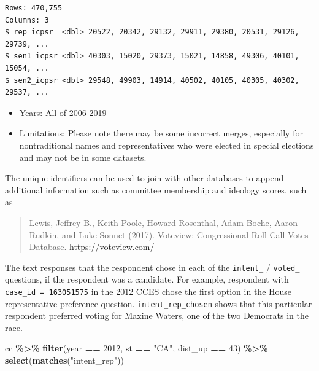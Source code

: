 \documentclass[10pt,article,oneside]{memoir}
\theoremstyle{definition}
\newenvironment{Shaded}{\begin{snugshade}}{\end{snugshade}}
\newcommand{\DecValTok}[1]{\textcolor[rgb]{0.00,0.00,0.81}{#1}}
\newcommand{\KeywordTok}[1]{\textcolor[rgb]{0.13,0.29,0.53}{\textbf{#1}}}
\newcommand{\NormalTok}[1]{#1}
\newcommand{\OperatorTok}[1]{\textcolor[rgb]{0.81,0.36,0.00}{\textbf{#1}}}
\newcommand{\StringTok}[1]{\textcolor[rgb]{0.31,0.60,0.02}{#1}}
\begin{document}
\begin{verbatim}
Rows: 470,755
Columns: 3
$ rep_icpsr  <dbl> 20522, 20342, 29132, 29911, 29380, 20531, 29126, 29739, ...
$ sen1_icpsr <dbl> 40303, 15020, 29373, 15021, 14858, 49306, 40101, 15054, ...
$ sen2_icpsr <dbl> 29548, 49903, 14914, 40502, 40105, 40305, 40302, 29537, ...
\end{verbatim}

\begin{itemize}
\tightlist
\item
  Years: All of 2006-2019
\item
  Limitations: Please note there may be some incorrect merges,
  especially for nontraditional names and representatives who were
  elected in special elections and may not be in some datasets.
\end{itemize}

The unique identifiers can be used to join with other databases to
append additional information such as committee membership and ideology
scores, such as

\begin{quote}
Lewis, Jeffrey B., Keith Poole, Howard Rosenthal, Adam Boche, Aaron
Rudkin, and Luke Sonnet (2017). Voteview: Congressional Roll-Call Votes
Database. \url{https://voteview.com/}
\end{quote}

The text responses that the respondent chose in each of the
\texttt{intent\_} / \texttt{voted\_} questions, if the respondent was a
candidate. For example, respondent with \texttt{case\_id\ =\ 163051575}
in the 2012 CCES chose the first option in the House representative
preference question. \texttt{intent\_rep\_chosen} shows that this
particular respondent preferred voting for Maxine Waters, one of the two
Democrats in the race.

\begin{Shaded}
\begin{Highlighting}[]
\NormalTok{cc }\OperatorTok{\%>\%}\StringTok{ }
\StringTok{  }\KeywordTok{filter}\NormalTok{(year }\OperatorTok{==}\StringTok{ }\DecValTok{2012}\NormalTok{, st }\OperatorTok{==}\StringTok{ "CA"}\NormalTok{, dist\_up }\OperatorTok{==}\StringTok{ }\DecValTok{43}\NormalTok{) }\OperatorTok{\%>\%}\StringTok{ }
\StringTok{  }\KeywordTok{select}\NormalTok{(}\KeywordTok{matches}\NormalTok{(}\StringTok{"intent\_rep"}\NormalTok{)) }
\end{Highlighting}
\end{Shaded}
\end{document}
